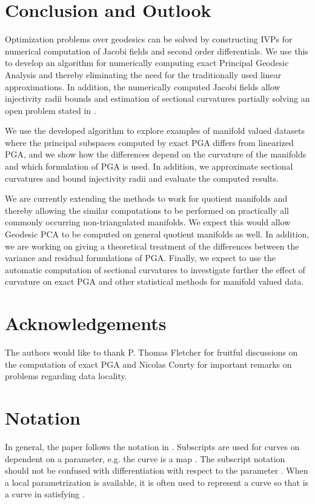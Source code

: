 \documentclass[final]{svjour3}
\begin{document}
\section{Conclusion and Outlook}
Optimization problems over geodesics can be solved by constructing 
IVPs for numerical computation of Jacobi fields and second order differentials.
We use this to develop an algorithm for numerically computing exact Principal 
Geodesic Analysis and thereby eliminating the need for the traditionally
used linear approximations. In addition, the numerically computed Jacobi fields
allow injectivity radii bounds and estimation of sectional curvatures partially
solving an open problem stated in \cite{huckemann_intrinsic_2010}.

We use the developed algorithm to explore examples of manifold valued datasets where 
the principal subspaces computed by exact PGA differs from linearized PGA, and we show 
how the differences 
depend on the curvature of the manifolds and which 
formulation of PGA is used. In addition, we 
approximate sectional curvatures and bound injectivity radii and evaluate the
computed results.

We are currently extending the methods to work for quotient manifolds
 and thereby allowing the similar computations to be performed on practically all
commonly occurring non-triangulated manifolds.
We expect this would allow Geodesic PCA to be computed on general 
quotient manifolds as well.
In addition, we are working on giving a theoretical treatment of the differences
between the variance and residual formulations of PGA. Finally, we
expect to use the automatic computation of sectional curvatures to investigate
further the effect of curvature on exact PGA and other 
statistical methods for manifold valued data.


\section*{Acknowledgements}
The authors would like to thank P. Thomas Fletcher for fruitful discussions on
the computation of exact PGA and Nicolas Courty for important remarks on
problems regarding data locality. 

\appendix

\section{Notation}
\label{app:notation}
In general, the paper follows the notation in \cite{do_carmo_riemannian_1992}.
Subscripts are used for curves on  dependent on a parameter,
e.g. the curve  is a map .
The subscript notation should 
not be confused with differentiation with respect to the parameter .
When a local parametrization  is
available, it is often used to represent a
curve  so that  is a curve in  satisfying .
\end{document}
